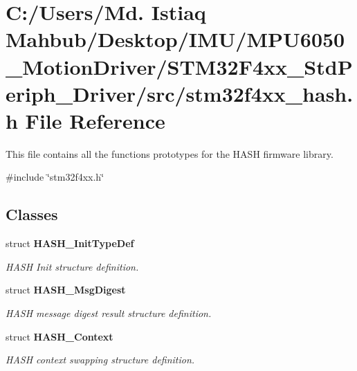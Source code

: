 \section{C\+:/\+Users/\+Md. Istiaq Mahbub/\+Desktop/\+I\+M\+U/\+M\+P\+U6050\+\_\+\+Motion\+Driver/\+S\+T\+M32\+F4xx\+\_\+\+Std\+Periph\+\_\+\+Driver/src/stm32f4xx\+\_\+hash.h File Reference}
\label{stm32f4xx__hash_8h}


This file contains all the functions prototypes for the H\+A\+SH firmware library.  


{\ttfamily \#include \char`\"{}stm32f4xx.\+h\char`\"{}}\newline
\subsection*{Classes}
\begin{DoxyCompactItemize}
\item 
struct \textbf{ H\+A\+S\+H\+\_\+\+Init\+Type\+Def}
\begin{DoxyCompactList}\small\item\em H\+A\+SH Init structure definition. \end{DoxyCompactList}\item 
struct \textbf{ H\+A\+S\+H\+\_\+\+Msg\+Digest}
\begin{DoxyCompactList}\small\item\em H\+A\+SH message digest result structure definition. \end{DoxyCompactList}\item 
struct \textbf{ H\+A\+S\+H\+\_\+\+Context}
\begin{DoxyCompactList}\small\item\em H\+A\+SH context swapping structure definition. \end{DoxyCompactList}\end{DoxyCompactItemize}
